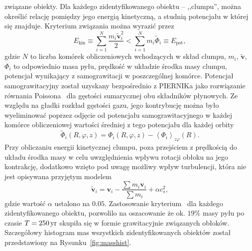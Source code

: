 związane obiekty. Dla każdego zidentyfikowanego obiektu -- ,,clumpu'', można
określić relację pomiędzy jego energią kinetyczną, a studnią potencjału w której
się znajduje. Kryterium związania można wyrazić przez
\begin{equation}
   \label{eq:bcrit}
   E_{\textrm{kin}} \equiv \sum\limits_{i=1}^N \frac{m_i\tilde{\mathbf{v}}_i^2}{2} 
   < \sum\limits_{i=1}^N m_i\tilde{\Phi}_i \equiv E_{\textrm{pot}},
\end{equation}
gdzie $N$ to liczba komórek obliczeniowych wchodzących w skład clumpu, $m_i$,
$\tilde{\mathbf{v}}$, $\Phi_i$ to odpowiednio masa pyłu, prędkość w układzie
środka masy clumpu, potencjał wynikający z samograwitacji w poszczególnej
komórce. Potencjał samograwitacyjny został uzyskany bezpośrednio z PIERNIKa jako
rozwiązanie równania Poissona~ dla gęstości sumarycznej obu
składników płynowych. Ze względu na gładki rozkład gęstości gazu, jego
kontrybucję można było wyeliminować poprzez odjęcie od potencjału
samograwitacyjnego w każdej komórce obliczeniowej wartości średniej z tego
potencjału dla każdej orbity
\begin{equation}
   \tilde{\Phi}_i(R,\varphi,z) = \Phi_i(R,\varphi,z) -
   \left<\Phi_i\right>_{z\varphi}(R).
\end{equation}
%
Przy obliczaniu energii kinetycznej clumpu, poza przejściem z prędkością do układu środka
masy w celu uwzględnienia wpływu rotacji obłoku na jego kontrakcję, dodatkowo
wzięto pod uwagę możliwy wpływ turbulencji, która nie jest opisywana przyjętym
modelem
\begin{equation}
   \tilde{\mathbf{v}}_i = \mathbf{v}_i - \frac{\sum m_i \mathbf{v}_i}{\sum m_i}
   + \alpha c_s^2,
\end{equation}
gdzie wartość $\alpha$ ustalono na $0.05$. Zastosowanie
kryterium~ dla każdego zidentyfikowanego obiektu, pozwolilo na
oszacowanie że ok. $19\%$ masy pyłu po czasie $T = 250\hbox{$\thinspace\textrm{yr}$}$ skupiła się w formie
grawitacyjnie związanych obłoków. Szczegółowy histogram mas wszystkich
zidentyfikowanych obiektów został przedstawiony na Rysunku~\ref{fig:masshist}.
